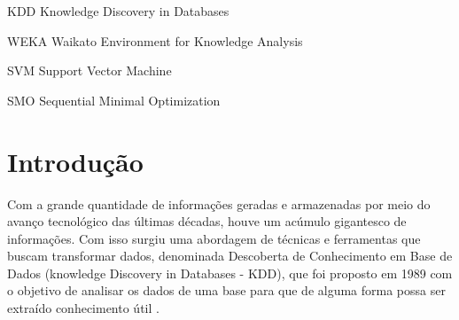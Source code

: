 \documentclass[
	12pt,				%
	openright,			%
	oneside,	
	a4paper,				%
	english,				%
	brazil				%
]{abntex2/abntex2} %
\begin{document}



 

\listoffigures*
\cleardoublepage

\listoftables*
\cleardoublepage

\begin{siglas}
  \item[KDD] Knowledge Discovery in Databases
  \item[WEKA] Waikato Environment for Knowledge Analysis
  \item[SVM] Support Vector Machine
  \item[SMO] Sequential Minimal Optimization
\end{siglas}




\tableofcontents*
\cleardoublepage

\textual

\chapter{Introdução}

	Com a grande quantidade de informações geradas e armazenadas por meio do avanço tecnológico das últimas décadas, houve um acúmulo gigantesco de informações. Com isso surgiu uma abordagem de técnicas e ferramentas que buscam transformar dados, denominada Descoberta de Conhecimento em Base de Dados (knowledge Discovery in Databases - KDD), que foi proposto em 1989 com o objetivo de analisar os dados de uma base para que de alguma forma possa ser extraído conhecimento útil \cite{fayyad:1996}.	
	
\end{document}
